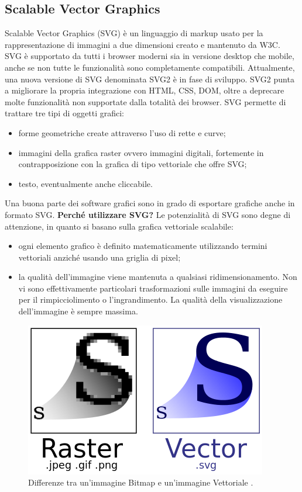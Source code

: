 \subsection{Scalable Vector Graphics}
\noindent Scalable Vector Graphics (SVG) è un linguaggio di markup usato per la rappresentazione di immagini a due dimensioni creato e mantenuto da W3C.\newline
SVG è supportato da tutti i browser moderni sia in versione desktop che mobile, anche se non tutte le funzionalità sono completamente compatibili.\newline
Attualmente, una nuova versione di SVG denominata SVG2 è in fase di sviluppo. SVG2 punta a migliorare la propria integrazione con HTML, CSS, DOM, oltre a deprecare molte funzionalità non supportate dalla totalità dei browser.
SVG permette di trattare tre tipi di oggetti grafici:
\begin{itemize}
    \item forme geometriche create attraverso l'uso di rette e curve;
    \item immagini della grafica raster ovvero immagini digitali, fortemente in contrapposizione con la grafica di tipo vettoriale che offre SVG;
    \item testo, eventualmente anche cliccabile.
\end{itemize}
Una buona parte dei software grafici sono in grado di esportare grafiche anche in formato SVG.\newline
\textbf{Perché utilizzare SVG?}\newline
Le potenzialità di SVG sono degne di attenzione, in quanto si basano sulla grafica vettoriale scalabile:
\begin{itemize}
    \item ogni elemento grafico è definito matematicamente utilizzando termini vettoriali anziché usando una griglia di pixel;
    \item la qualità dell'immagine viene mantenuta a qualsiasi ridimensionamento. Non vi sono effettivamente particolari trasformazioni sulle immagini da eseguire per il rimpicciolimento o l'ingrandimento. La qualità della visualizzazione dell'immagine è sempre massima.
\end{itemize}

\begin{figure}[H]
    \centering
    \includegraphics[width=0.45\linewidth]{img/rastVect.png}
    \caption{Differenze tra un'immagine Bitmap e un'immagine Vettoriale \cite{wikipediaSVG}.}
    \label{rastVect}
\end{figure}


